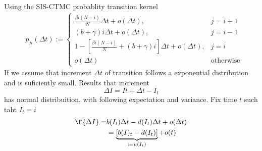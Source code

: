    \begin{frame}{}
        Using the SIS-CTMC probablity transition kernel 
        \begin{align*}
            &p_{ji}(\Delta t):=
                \begin{cases}
                    \frac{\beta i (N - i)}{N} \Delta t 
                        + o(\Delta t),     
                        & j = i + 1
                    \\
                    (b + \gamma) i \Delta t 
                        + o(\Delta t),
                        &   j = i - 1
                    \\
                    1 - \left [
                            \frac{\beta i (N - i)}{N} +
                            (b + \gamma) i %
                        \right] \Delta t
                        + o(\Delta t) , 
                        & j=i
                    \\
                    o(\Delta t) & \text{otherwise}
                \end{cases}
        \end{align*}
        If we assume that increment $\Delta t$ of transition follows a exponential
        distribution  and is suficiently small.
        Results that increment 
        $$
            \Delta I = I{t + \Delta t} - I_t
        $$  
        has normal distribuition, with following expectation and variance.
        Fix time $t$ such taht $I_t = i$
        \begin{align*}
            \E{\Delta I}
                =&
                    b(I_t) \Delta t - d(I_t) \Delta t + o(\Delta t)
                \\
                &=
                    \underbrace{
                        [b(I)_t - d(I_t)]
                    }_{:=\mu(I_t)} + o(t) 
        \end{align*}
    \end{frame}    
